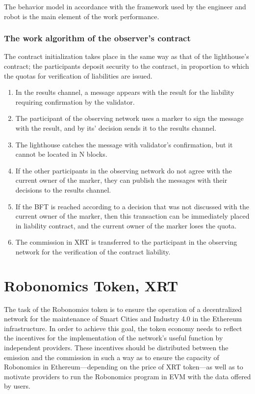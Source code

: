 \documentclass{article}
\begin{document}
The behavior model in accordance with the framework used by the engineer and robot is the main element of the work performance.

\subsubsection{The work algorithm of the observer's contract}

The contract initialization takes place in the same way as that of the lighthouse's contract; the participants deposit security to the contract, in proportion to which the quotas for verification of liabilities are issued.
\begin{enumerate}
	\item In the results channel, a message appears with the result for the liability requiring confirmation by the validator.
	\item The participant of the observing network uses a marker to sign the message with the result, and by its' decision sends it to the results channel.
	\item The lighthouse catches the message with validator's confirmation, but it cannot be located in N blocks.
	\item If the other participants in the observing network do not agree with the current owner of the marker, they can publish the messages with their decisions to the results channel.
	\item If the BFT is reached according to a decision that was not discussed with the current owner of the marker, then this transaction can be immediately placed in liability contract, and the current owner of the marker loses the quota.
	\item The commission in XRT is transferred to the participant in the observing network for the verification of the contract liability.
\end{enumerate}

\section{Robonomics Token, XRT}

The task of the Robonomics token is to ensure the operation of a decentralized network for the maintenance of Smart Cities and Industry 4.0 in the Ethereum infrastructure. In order to achieve this goal, the token economy needs to reflect the incentives for the implementation of the network's useful function by independent providers. These incentives should be distributed between the emission and the commission in such a way as to ensure the capacity of Robonomics in Ethereum—depending on the price of XRT token—as well as to motivate providers to run the Robonomics program in EVM with the data offered by users.
\end{document}
